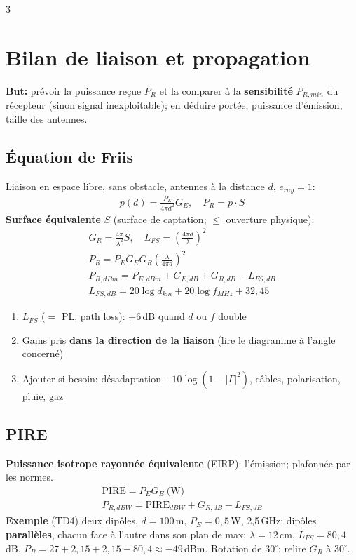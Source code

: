 \documentclass[12pt, a4paper]{article}
\begin{document}
\begin{multicols*}{3}
	\colbreak
	\section{Bilan de liaison et propagation}
	\textbf{But:} prévoir la puissance reçue $P_R$ et la comparer à la \textbf{sensibilité} $P_{R,min}$ du récepteur (sinon signal inexploitable); en déduire portée, puissance d'émission, taille des antennes.

	\subsection{Équation de Friis}
	Liaison en espace libre, sans obstacle, antennes à la distance $d$, $e_{ray}=1$:
	\begin{gather*}
		p(d)=\frac{P_E}{4\pi d^2}G_E,\quad P_R=p\cdot S
	\end{gather*}
	\textbf{Surface équivalente} $S$ (surface de captation; $\leq$ ouverture physique):
	\begin{gather*}
		G_R=\frac{4\pi}{\lambda^2}S,\quad L_{FS}=\left(\frac{4\pi d}{\lambda}\right)^2\\
		\boxed{P_R=P_EG_EG_R\left(\frac{\lambda}{4\pi d}\right)^2}\\
		P_{R,dBm}=P_{E,dBm}+G_{E,dB}+G_{R,dB}-L_{FS,dB}\\
		L_{FS,dB}=20\log d_{km}+20\log f_{MHz}+32{,}45
	\end{gather*}
	\begin{enumerate}[\roman*.]
		\item $L_{FS}$ ($=$ PL, path loss): $+6$\,dB quand $d$ ou $f$ double
		\item Gains pris \textbf{dans la direction de la liaison} (lire le diagramme à l'angle concerné)
		\item Ajouter si besoin: désadaptation $-10\log(1-|\Gamma|^2)$, câbles, polarisation, pluie, gaz
	\end{enumerate}

	\subsection{PIRE}
	\textbf{Puissance isotrope rayonnée équivalente} (EIRP): l'émission; plafonnée par les normes.
	\begin{gather*}
		\mathrm{PIRE}=P_EG_E\ \text{(W)}\\ P_{R,dBW}=\mathrm{PIRE}_{dBW}+G_{R,dB}-L_{FS,dB}
	\end{gather*}
	\textbf{Exemple} (TD4) deux dipôles, $d=100$\,m, $P_E=0{,}5$\,W, 2,5\,GHz: dipôles \textbf{parallèles}, chacun face à l'autre dans son plan de max; $\lambda=12$\,cm, $L_{FS}=80{,}4$\,dB, $P_R=27+2{,}15+2{,}15-80{,}4\approx-49$\,dBm. Rotation de $30^\circ$: relire $G_R$ à $30^\circ$.


\end{multicols*}
\end{document}
